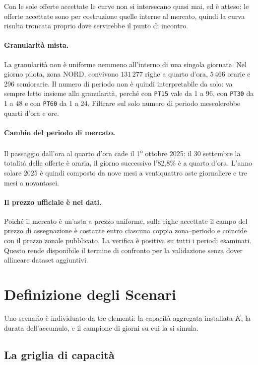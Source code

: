 Con le sole offerte accettate le curve non si intersecano quasi mai, ed \`e atteso: le
offerte accettate sono per costruzione quelle interne al mercato, quindi la curva risulta
troncata proprio dove servirebbe il punto di incontro.

\paragraph{Granularit\`a mista.} La granularit\`a non \`e uniforme nemmeno all'interno di una
singola giornata. Nel giorno pilota, zona NORD, convivono $131\,277$ righe a quarto d'ora,
$5\,466$ orarie e 296 semiorarie. Il numero di periodo non \`e quindi interpretabile da solo:
va sempre letto insieme alla granularit\`a, perch\'e con \texttt{PT15} vale da 1 a 96, con
\texttt{PT30} da 1 a 48 e con \texttt{PT60} da 1 a 24. Filtrare sul solo numero di periodo
mescolerebbe quarti d'ora e ore.

\paragraph{Cambio del periodo di mercato.} Il passaggio dall'ora al quarto d'ora cade il
1\textsuperscript{o} ottobre 2025: il 30 settembre la totalit\`a delle offerte \`e oraria, il
giorno successivo l'82{,}8\% \`e a quarto d'ora. L'anno solare 2025 \`e quindi composto da
nove mesi a ventiquattro aste giornaliere e tre mesi a novantasei.

\paragraph{Il prezzo ufficiale \`e nei dati.} Poich\'e il mercato \`e un'asta a prezzo
uniforme, sulle righe accettate il campo del prezzo di assegnazione \`e costante entro
ciascuna coppia zona--periodo e coincide con il prezzo zonale pubblicato. La verifica \`e
positiva su tutti i periodi esaminati. Questo rende disponibile il termine di confronto per la
validazione senza dover allineare dataset aggiuntivi.

\section{Definizione degli Scenari}
\label{sec:scenari}

Uno scenario \`e individuato da tre elementi: la capacit\`a aggregata installata $K$, la
durata dell'accumulo, e il campione di giorni su cui la si simula.

\subsection{La griglia di capacit\`a}

